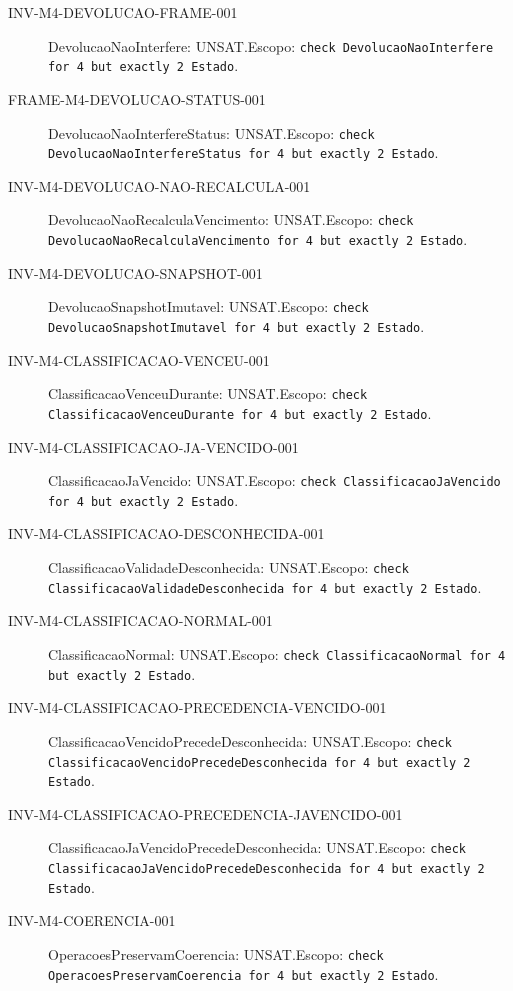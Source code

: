 \begin{description}
\item[INV-M4-DEVOLUCAO-FRAME-001] DevolucaoNaoInterfere: UNSAT.\newline Escopo: \texttt{check DevolucaoNaoInterfere for 4 but exactly 2 Estado}.
\item[FRAME-M4-DEVOLUCAO-STATUS-001] DevolucaoNaoInterfereStatus: UNSAT.\newline Escopo: \texttt{check DevolucaoNaoInterfereStatus for 4 but exactly 2 Estado}.
\item[INV-M4-DEVOLUCAO-NAO-RECALCULA-001] DevolucaoNaoRecalculaVencimento: UNSAT.\newline Escopo: \texttt{check DevolucaoNaoRecalculaVencimento for 4 but exactly 2 Estado}.
\item[INV-M4-DEVOLUCAO-SNAPSHOT-001] DevolucaoSnapshotImutavel: UNSAT.\newline Escopo: \texttt{check DevolucaoSnapshotImutavel for 4 but exactly 2 Estado}.
\item[INV-M4-CLASSIFICACAO-VENCEU-001] ClassificacaoVenceuDurante: UNSAT.\newline Escopo: \texttt{check ClassificacaoVenceuDurante for 4 but exactly 2 Estado}.
\item[INV-M4-CLASSIFICACAO-JA-VENCIDO-001] ClassificacaoJaVencido: UNSAT.\newline Escopo: \texttt{check ClassificacaoJaVencido for 4 but exactly 2 Estado}.
\item[INV-M4-CLASSIFICACAO-DESCONHECIDA-001] ClassificacaoValidadeDesconhecida: UNSAT.\newline Escopo: \texttt{check ClassificacaoValidadeDesconhecida for 4 but exactly 2 Estado}.
\item[INV-M4-CLASSIFICACAO-NORMAL-001] ClassificacaoNormal: UNSAT.\newline Escopo: \texttt{check ClassificacaoNormal for 4 but exactly 2 Estado}.
\item[INV-M4-CLASSIFICACAO-PRECEDENCIA-VENCIDO-001] ClassificacaoVencidoPrecedeDesconhecida: UNSAT.\newline Escopo: \texttt{check ClassificacaoVencidoPrecedeDesconhecida for 4 but exactly 2 Estado}.
\item[INV-M4-CLASSIFICACAO-PRECEDENCIA-JAVENCIDO-001] ClassificacaoJaVencidoPrecedeDesconhecida: UNSAT.\newline Escopo: \texttt{check ClassificacaoJaVencidoPrecedeDesconhecida for 4 but exactly 2 Estado}.
\item[INV-M4-COERENCIA-001] OperacoesPreservamCoerencia: UNSAT.\newline Escopo: \texttt{check OperacoesPreservamCoerencia for 4 but exactly 2 Estado}.

\end{description}
